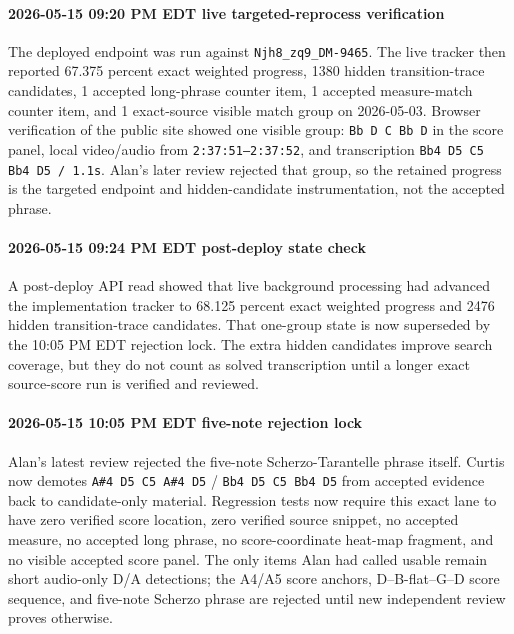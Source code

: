 \paragraph{2026-05-15 09:20 PM EDT live targeted-reprocess verification} The deployed endpoint was run against \texttt{Njh8\_zq9\_DM-9465}. The live tracker then reported 67.375 percent exact weighted progress, 1380 hidden transition-trace candidates, 1 accepted long-phrase counter item, 1 accepted measure-match counter item, and 1 exact-source visible match group on 2026-05-03. Browser verification of the public site showed one visible group: \texttt{Bb D C Bb D} in the score panel, local video/audio from \texttt{2:37:51--2:37:52}, and transcription \texttt{Bb4 D5 C5 Bb4 D5 / 1.1s}. Alan's later review rejected that group, so the retained progress is the targeted endpoint and hidden-candidate instrumentation, not the accepted phrase.

\paragraph{2026-05-15 09:24 PM EDT post-deploy state check} A post-deploy API read showed that live background processing had advanced the implementation tracker to 68.125 percent exact weighted progress and 2476 hidden transition-trace candidates. That one-group state is now superseded by the 10:05 PM EDT rejection lock. The extra hidden candidates improve search coverage, but they do not count as solved transcription until a longer exact source-score run is verified and reviewed.

\paragraph{2026-05-15 10:05 PM EDT five-note rejection lock} Alan's latest review rejected the five-note Scherzo-Tarantelle phrase itself. Curtis now demotes \texttt{A\#4 D5 C5 A\#4 D5} / \texttt{Bb4 D5 C5 Bb4 D5} from accepted evidence back to candidate-only material. Regression tests now require this exact lane to have zero verified score location, zero verified source snippet, no accepted measure, no accepted long phrase, no score-coordinate heat-map fragment, and no visible accepted score panel. The only items Alan had called usable remain short audio-only D/A detections; the A4/A5 score anchors, D--B-flat--G--D score sequence, and five-note Scherzo phrase are rejected until new independent review proves otherwise.

